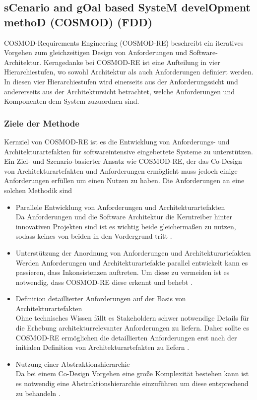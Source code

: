 \subsection{sCenario and gOal based SysteM develOpment methoD (COSMOD) (FDD)}\label{scgo}
COSMOD-Requirements Engineering (COSMOD-RE) beschreibt ein iteratives Vorgehen zum gleichzeitigen Design von Anforderungen und Software-Architektur. Kerngedanke bei COSMOD-RE ist eine Aufteilung in vier Hierarchiestufen, wo sowohl Architektur als auch Anforderungen definiert werden. In diesen vier Hierarchiestufen wird einerseits aus der Anforderungssicht und andererseits aus der Architektursicht betrachtet, welche Anforderungen und Komponenten dem System zuzuordnen sind.\\

\subsubsection{Ziele der Methode}
Kernziel von COSMOD-RE ist es die Entwicklung von Anforderungs- und Architekturartefakten für softwareintensive eingebettete Systeme zu unterstützen. Ein Ziel- und Szenario-basierter Ansatz wie COSMOD-RE, der das Co-Design von Architekturartefakten und Anforderungen ermöglicht muss jedoch einige Anforderungen erfüllen um einen Nutzen zu haben. Die Anforderungen an eine solchen Methodik sind \cite{pohl}\\
 
\begin{itemize}
\item Parallele Entwicklung von Anforderungen und Architekturartefakten \\
Da Anforderungen und die Software Architektur die Kerntreiber hinter innovativen Projekten sind ist es wichtig beide gleichermaßen zu nutzen, sodass keines von beiden in den Vordergrund tritt \cite{pohl}.
\item Unterstützung der Anordnung von Anforderungen und Architekturartefakten \\
Werden Anforderungen und Architekturartefakte parallel entwickelt kann es passieren, dass Inkonsistenzen auftreten. Um diese zu vermeiden ist es notwendig, dass COSMOD-RE diese erkennt und behebt \cite{pohl}.
\item Definition detaillierter Anforderungen auf der Basis von Architekturartefakten \\
Ohne technisches Wissen fällt es Stakeholdern schwer notwendige Details für die Erhebung architekturrelevanter Anforderungen zu liefern. Daher sollte es COSMOD-RE ermöglichen die detaillierten Anforderungen erst nach der initialen Definition von Architekturartefakten zu liefern \cite{pohl}. 
\item Nutzung einer Abstraktionshierarchie \\
Da bei einem Co-Design Vorgehen eine große Komplexität bestehen kann ist es notwendig eine Abstraktionshierarchie einzuführen um diese entsprechend zu behandeln \cite{pohl}.\\
\end{itemize}

